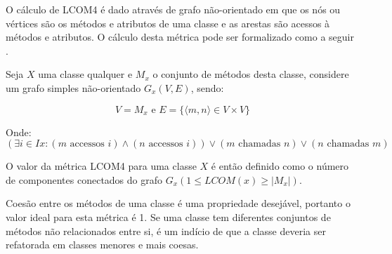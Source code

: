 \begin{itemize}
O cálculo de LCOM4 é dado através de grafo não-orientado em que os nós ou
vértices são os métodos e atributos de uma classe e as arestas são acessos à
métodos e atributos. O cálculo desta métrica pode ser formalizado como a
seguir \cite{Silva2012}.

Seja $ X $ uma classe qualquer e $ M_x $ o conjunto de métodos desta classe,
considere um grafo simples não-orientado $ G_x(V, E) $, sendo:

\begin{equation}
V = M_x
\text{ e }
E = \{ \langle m, n \rangle \in V \times V \}
\end{equation}

Onde:
\begin{equation}
(\exists i \in Ix : (m \text{ accessos } i) \land (n \text{ accessos } i)) \lor (m \text{ chamadas } n) \lor (n \text{ chamadas } m)
\end{equation}

O valor da métrica LCOM4 para uma classe $ X $ é então definido como o número
de componentes conectados do grafo $ G_x (1 \leq LCOM(x) \geq | M_x |)$.

Coesão entre os métodos de uma classe é uma propriedade desejável, portanto o
valor ideal para esta métrica é 1. Se uma classe tem diferentes conjuntos de
métodos não relacionados entre si, é um indício de que a classe deveria ser
refatorada em classes menores e mais coesas.

\end{itemize}

%
%
%
%
